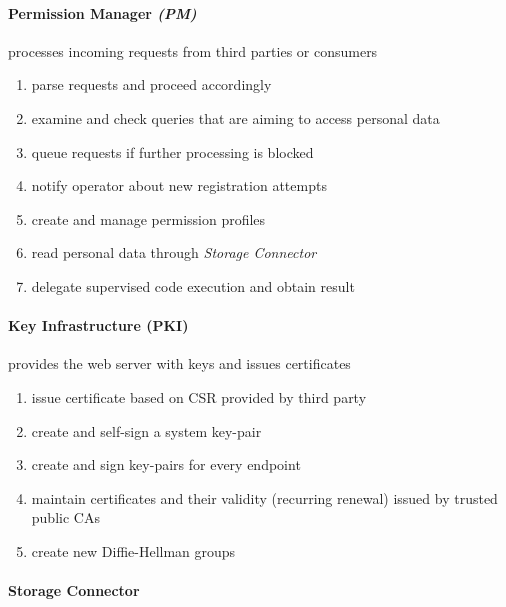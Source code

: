 \documentclass[12pt,english,a4paper,titlepage,cleardoublepage=empty,dottedtoc]{report}
\providecommand{\tightlist}{%
  \setlength{\itemsep}{0pt}\setlength{\parskip}{0pt}}
\begin{document}
\paragraph{\texorpdfstring{Permission Manager
\emph{(PM)}}{Permission Manager (PM)}}\label{permission-manager-pm}

processes incoming requests from third parties or consumers

\begin{enumerate}
\def\labelenumi{\alph{enumi})}
\tightlist
\item
  parse requests and proceed accordingly
\item
  examine and check queries that are aiming to access personal data
\item
  queue requests if further processing is blocked
\item
  notify operator about new registration attempts
\item
  create and manage permission profiles
\item
  read personal data through \emph{Storage Connector}
\item
  delegate supervised code execution and obtain result
\end{enumerate}

\paragraph{Key Infrastructure (PKI)}\label{key-infrastructure-pki}

provides the web server with keys and issues certificates

\begin{enumerate}
\def\labelenumi{\alph{enumi})}
\tightlist
\item
  issue certificate based on CSR provided by third party
\item
  create and self-sign a system key-pair
\item
  create and sign key-pairs for every endpoint
\item
  maintain certificates and their validity (recurring renewal) issued by
  trusted public CAs
\item
  create new Diffie-Hellman groups
\end{enumerate}

\paragraph{Storage Connector}\label{storage-connector-1}
\end{document}
